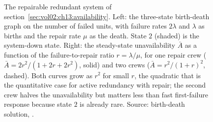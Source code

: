 \begin{figure}[htbp]
\caption[Availability of a two-unit repairable system]{The repairable
redundant system of section~\ref{sec:vol02:ch13:availability}. Left: the
three-state birth-death graph on the number of failed units, with failure
rates $2\lambda$ and $\lambda$ as births and the repair rate $\mu$ as the
death. State $2$ (shaded) is the system-down state. Right: the
steady-state unavailability $\bar A$ as a function of the
failure-to-repair ratio $r = \lambda/\mu$, for one repair crew
($\bar A = 2r^{2}/(1 + 2r + 2r^{2})$, solid) and two crews
($\bar A = r^{2}/(1 + r)^{2}$, dashed). Both curves grow as $r^{2}$ for
small $r$, the quadratic that is the quantitative case for active
redundancy with repair; the second crew halves the unavailability but
matters less than fast first-failure response because state $2$ is
already rare. Source: birth-death solution,
\cite[ch.~6]{text:wasserman2004}.}
\label{fig:vol02:ch13:availability}
\end{figure}
